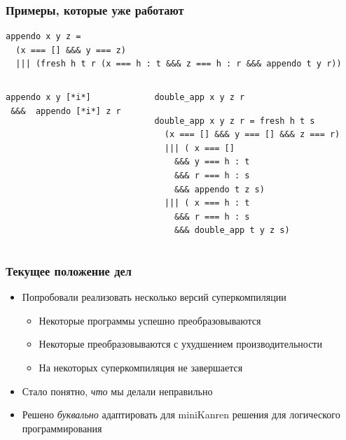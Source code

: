 \documentclass{beamer}
\begin{document}
\begin{frame}[fragile,t]
  \transwipe[direction=90]
  \frametitle{Примеры, которые уже работают}
\begin{center}
\begin{minipage}[c]{9.5cm}
\begin{lstlisting}[frame=single]  
appendo x y z = 
  (x === [] &&& y === z)
  ||| (fresh h t r (x === h : t &&& z === h : r &&& appendo t y r))
\end{lstlisting}
\end{minipage}
\end{center}

\vspace{-0.5cm}

\begin{columns}[t]
\begin{column}{4cm}
\begin{badcode}
\begin{lstlisting}[frame=single]  
appendo x y [*i*] 
 &&&  appendo [*i*] z r
\end{lstlisting}
\end{badcode}
\end{column}

\pause

\begin{column}{6cm}
\begin{goodcode}
\begin{lstlisting}[frame=single]  
double_app x y z r
\end{lstlisting}

\begin{lstlisting}[frame=single]  
double_app x y z r = fresh h t s 
  (x === [] &&& y === [] &&& z === r)
  ||| ( x === [] 
    &&& y === h : t 
    &&& r === h : s 
    &&& appendo t z s)
  ||| ( x === h : t 
    &&& r === h : s 
    &&& double_app t y z s)
\end{lstlisting}
\end{goodcode}
\end{column}
\end{columns}
\end{frame}

\begin{frame}[fragile]
  \transwipe[direction=90]
  \frametitle{Текущее положение дел}
\begin{itemize}
  \item Попробовали реализовать несколько версий суперкомпиляции
  \begin{itemize}
    \item Некоторые программы успешно преобразовываются
    \item Некоторые преобразовываются с ухудшением производительности
    \item На некоторых суперкомпиляция не завершается
  \end{itemize}
  \item Стало понятно, \emph{что} мы делали неправильно
  \item Решено \emph{буквально} адаптировать для miniKanren решения для логического программирования 
\end{itemize}
\end{frame}
\end{document}
